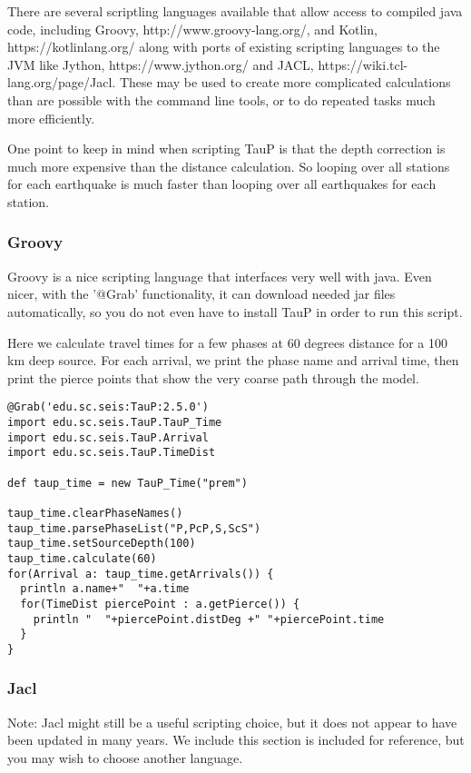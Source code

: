 There are several scriptling languages available that allow access to compiled
java code, including Groovy, http://www.groovy-lang.org/, and Kotlin,
https://kotlinlang.org/ along with ports of existing scripting
languages to the JVM like
Jython, https://www.jython.org/ and JACL, https://wiki.tcl-lang.org/page/Jacl.
These may be used to create more complicated
calculations than are possible with the command line tools, or to do repeated
tasks much more efficiently.

One point to keep in mind when scripting TauP is that the depth correction is
much more expensive than the distance calculation. So looping over all
stations for each earthquake is much faster than looping over all earthquakes
for each station.

\subsubsection{Groovy}

Groovy is a nice scripting language that interfaces very well with java. Even nicer, with the '@Grab' functionality, it can download needed jar files automatically, so you do
not even have to install TauP in order to run this script.

Here we calculate travel times for a few phases at 60 degrees distance
for a 100 km deep source. For each arrival, we print the phase name
and arrival time, then print the pierce points that show the very coarse
path through the model.

\begin{verbatim}
@Grab('edu.sc.seis:TauP:2.5.0')
import edu.sc.seis.TauP.TauP_Time
import edu.sc.seis.TauP.Arrival
import edu.sc.seis.TauP.TimeDist

def taup_time = new TauP_Time("prem")

taup_time.clearPhaseNames()
taup_time.parsePhaseList("P,PcP,S,ScS")
taup_time.setSourceDepth(100)
taup_time.calculate(60)
for(Arrival a: taup_time.getArrivals()) {
  println a.name+"  "+a.time
  for(TimeDist piercePoint : a.getPierce()) {
    println "  "+piercePoint.distDeg +" "+piercePoint.time
  }
}
\end{verbatim}

\subsubsection{Jacl}

Note: Jacl might still be a useful scripting choice, but it does not appear to have
been updated in many years. We include this section is included for reference,
but you may wish to choose another language.

